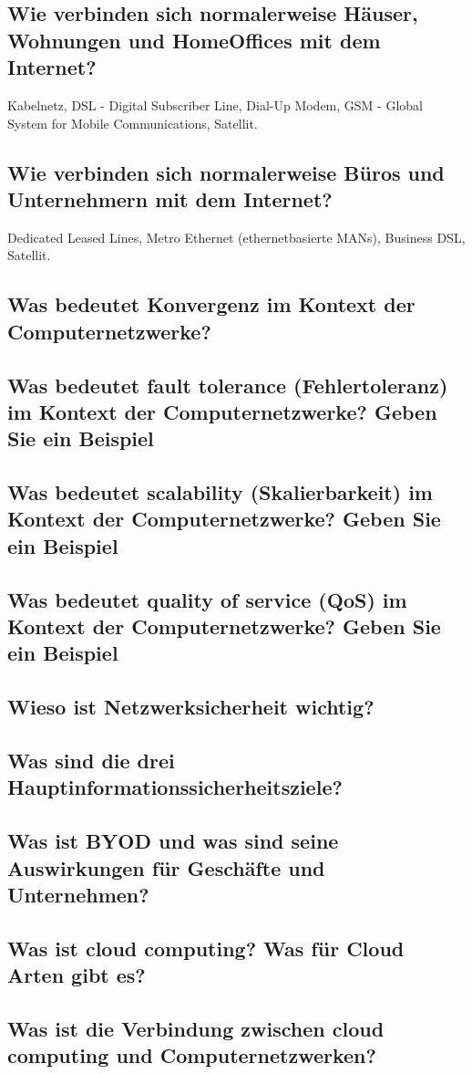 \subsection*{Wie verbinden sich normalerweise Häuser, Wohnungen und HomeOffices mit dem Internet?}
Kabelnetz, DSL - Digital Subscriber Line, Dial-Up Modem, GSM - Global System for Mobile Communications, Satellit.
\subsection*{Wie verbinden sich normalerweise Büros und Unternehmern mit dem Internet?}
Dedicated Leased Lines, Metro Ethernet (ethernetbasierte MANs), Business DSL, Satellit.
\subsection*{Was bedeutet Konvergenz im Kontext der Computernetzwerke?}
\subsection*{Was bedeutet \flqq fault tolerance\frqq{} (Fehlertoleranz) im Kontext der Computernetzwerke? Geben Sie ein Beispiel}
\subsection*{Was bedeutet \flqq scalability\frqq{} (Skalierbarkeit) im Kontext der Computernetzwerke? Geben Sie ein Beispiel}
\subsection*{Was bedeutet \flqq quality of service (QoS)\frqq{} im Kontext der Computernetzwerke? Geben Sie ein Beispiel}
\subsection*{Wieso ist Netzwerksicherheit wichtig?}
\subsection*{Was sind die drei Hauptinformationssicherheitsziele?}
\subsection*{Was ist \flqq BYOD\frqq{} und was sind seine Auswirkungen für Geschäfte und Unternehmen?}
\subsection*{Was ist \flqq cloud computing\frqq{}? Was für Cloud Arten gibt es?}
\subsection*{Was ist die Verbindung zwischen \flqq cloud computing\frqq{} und Computernetzwerken?}
